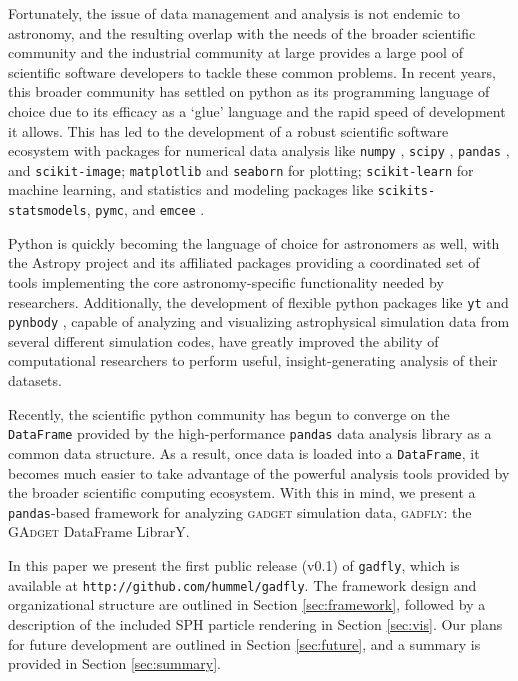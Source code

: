 \documentclass{emulateapj}
\newcommand{\code}[1]{\texttt{#1}}
\begin{document}
Fortunately, the issue of data management and analysis is not endemic to astronomy, and the resulting overlap with the needs of the broader scientific community and the industrial community at large provides a large pool of scientific software developers to tackle these common problems.
In recent years, this broader community has settled on python as its programming language of choice due to its efficacy as a `glue' language and the rapid speed of development it allows.  
This has led to the development of a robust scientific software ecosystem with packages for numerical data analysis like \code{numpy} \citep{VanderWaltColbertVaroquaux2011}, \code{scipy} \citep{JonesOliphantPeterson2001}, \code{pandas} \citep{McKinney2010}, and \code{scikit-image}; \code{matplotlib} \citep{Hunter2007} and \code{seaborn} for plotting; \code{scikit-learn} for machine learning, and statistics and modeling packages like \code{scikits-statsmodels}, \code{pymc}, and \code{emcee} \citep{Foreman-Mackeyetal2013}.

Python is quickly becoming the language of choice for astronomers as well, with the Astropy project \citep{Robitailleetal2013} and its affiliated packages providing a coordinated set of tools implementing the core astronomy-specific functionality needed by researchers. 
Additionally, the development of flexible python packages like \code{yt} \citep{Turketal2011} and \code{pynbody} \citep{Pontzenetal2013}, capable of analyzing and visualizing astrophysical simulation data from several different simulation codes, have greatly improved the ability of computational researchers to perform useful, insight-generating analysis of their datasets.

Recently, the scientific python community has begun to converge on the \code{DataFrame} provided by the high-performance \code{pandas} data analysis library as a common data structure. 
As a result, once data is loaded into a \code{DataFrame}, it becomes much easier to take advantage of the powerful analysis tools provided by the broader scientific computing ecosystem.
With this in mind, we present a \code{pandas}-based framework for analyzing \textsc{gadget} simulation data, \textsc{gadfly}: the \textsc{GAdget} DataFrame LibrarY.

In this paper we present the first public release (v0.1) of \code{gadfly}, which is available at \code{http://github.com/hummel/gadfly}. 
The framework design and organizational structure are outlined in Section \ref{sec:framework}, followed by a description of the included SPH particle rendering  in Section \ref{sec:vis}.  Our plans for future development are outlined in Section \ref{sec:future}, and a summary is provided in Section \ref{sec:summary}.
\end{document}
